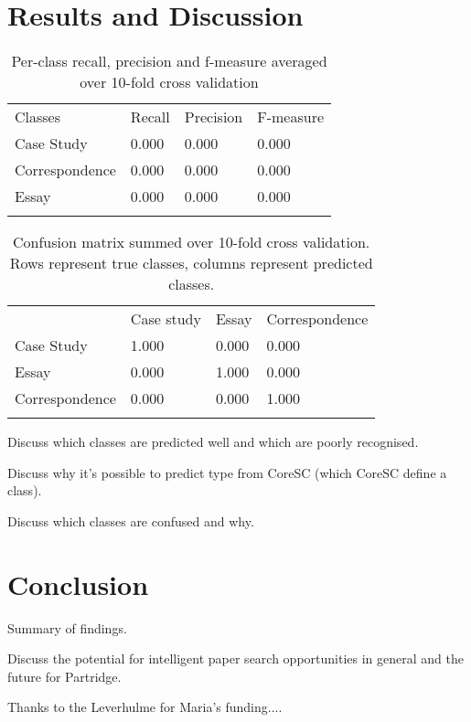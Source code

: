\documentclass{svmult}
\begin{document}
\section{Results and Discussion}
\label{sec:3}

\begin{table}
\caption{Per-class recall, precision and f-measure averaged over 10-fold cross validation}
\label{tab:1}       %
\begin{tabular}{p{2cm}p{2.4cm}p{2cm}p{4.9cm}}
\hline\noalign{\smallskip}
Classes & Recall & Precision & F-measure  \\
\noalign{\smallskip}\svhline\noalign{\smallskip}
Case Study & 0.000 & 0.000 & 0.000 \\
Correspondence & 0.000 & 0.000 & 0.000 \\
Essay & 0.000 & 0.000 & 0.000 \\
\noalign{\smallskip}\hline\noalign{\smallskip}
\end{tabular}
\end{table}

\begin{table}
\caption{Confusion matrix summed over 10-fold cross validation. Rows represent true classes, columns represent predicted classes.}
\label{tab:2}       %
\begin{tabular}{p{2cm}p{2.4cm}p{2cm}p{4.9cm}}
\hline\noalign{\smallskip}
 & Case study & Essay & Correspondence  \\
\noalign{\smallskip}\svhline\noalign{\smallskip}
Case Study & 1.000 & 0.000 & 0.000 \\
Essay & 0.000 & 1.000 & 0.000 \\
Correspondence & 0.000 & 0.000 & 1.000 \\
\noalign{\smallskip}\hline\noalign{\smallskip}
\end{tabular}
\end{table}



Discuss which classes are predicted well and which are poorly recognised.

Discuss why it's possible to predict type from CoreSC (which CoreSC define a class).

Discuss which classes are confused and why. 



\section{Conclusion}
\label{sec:4}

Summary of findings.

Discuss the potential for intelligent paper search opportunities in general and the future for Partridge.

\begin{acknowledgement}
Thanks to the Leverhulme for Maria's funding....
\end{acknowledgement}





%
\end{document}
